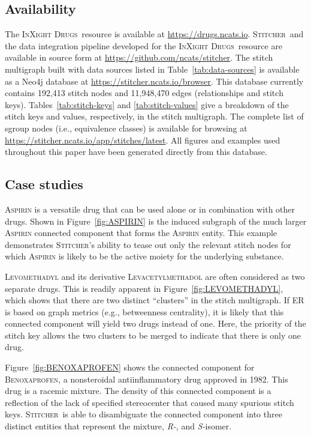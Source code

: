 \documentclass{bmcart}
\newcommand\st{\textsc{Stitcher}}
\newcommand\ix{\textsc{InXight Drugs}}
\begin{document}
\subsection*{Availability}
The \ix\ resource is available at \url{https://drugs.ncats.io}.
\st\ and the data integration pipeline developed for the \ix\ resource 
are available in source form
at \url{https://github.com/ncats/stitcher}. The stitch multigraph
built with data sources listed in Table~\ref{tab:data-sources} is 
available as a Neo4j database \cite{neo4j} 
at \url{https://stitcher.ncats.io/browser}. This database currently
contains 192,413 stitch nodes and 11,948,470 edges (relationships and stitch
keys). Tables~\ref{tab:stitch-keys} and \ref{tab:stitch-values} give a
breakdown of the stitch keys and values, respectively, in the stitch
multigraph. The complete list of sgroup nodes (i.e., equivalence classes) is
available for browsing at
\url{https://stitcher.ncats.io/app/stitches/latest}. All figures and
examples used throughout this paper have been generated directly from
this database.

\subsection*{Case studies}
\textsc{Aspirin} is a versatile drug that can be used alone or in
combination with other drugs. Shown in Figure~\ref{fig:ASPIRIN} is the
induced subgraph of the much larger \textsc{Aspirin} connected component that
forms the \textsc{Aspirin} entity. This example demonstrates \st's
ability to tease out only the relevant stitch nodes for which
\textsc{Aspirin} is likely to be the active moiety for the underlying
substance. 

\textsc{Levomethadyl} and its derivative \textsc{Levacetylmethadol} are
often considered as two separate drugs. This is readily apparent in
Figure~\ref{fig:LEVOMETHADYL}, which shows that there are two distinct
``clusters'' in the stitch multigraph. If ER is based on
graph metrics (e.g., betweenness centrality), it is likely that this
connected component will yield two drugs instead of one. Here, the
priority of the stitch key allows the two clusters to be merged to
indicate that there is only one drug.

Figure~\ref{fig:BENOXAPROFEN} shows the connected component for
\textsc{Benoxaprofen}, a nonsteroidal antiinflammatory drug approved in
1982. This drug is a racemic mixture. The density of this connected
component is a reflection of the lack of specified stereocenter that
caused many spurious stitch keys. \st\ is able to disambiguate the
connected component into three distinct entities that represent the
mixture, \emph{R-}, and \emph{S-}isomer.
\end{document}
